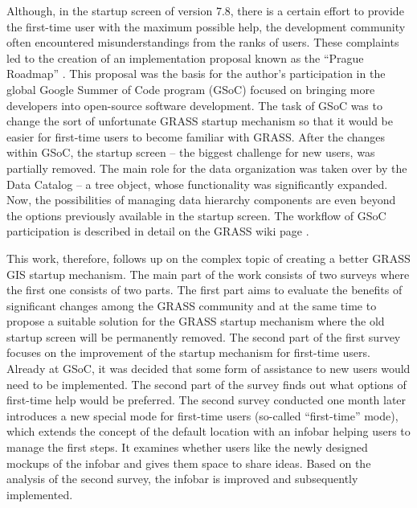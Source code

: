 \documentclass[a4paper,10pt,twoside]{article}
\begin{document}
Although, in the startup screen of version 7.8, there is a certain
effort to provide the first-time user with the maximum possible help,
the development community often encountered misunderstandings from the
ranks of users. These complaints led to the creation of an
implementation proposal known as the ``Prague Roadmap'' \cite{roadmap}. 
This proposal was
the basis for the author's participation in the global Google
Summer of Code program (GSoC) focused on bringing more
developers into open-source software development. The task of GSoC was
to change the sort of unfortunate GRASS startup mechanism so that it
would be easier for first-time users to become familiar with
GRASS. After the changes within GSoC, the startup screen -- the
biggest challenge for new users, was partially removed. The main role for
the data organization was taken over by the Data Catalog -- a tree
object, whose functionality was significantly expanded. Now, the
possibilities of managing data hierarchy components are even beyond
the options previously available in the startup screen.
The workflow of GSoC participation is described in detail on the 
GRASS wiki page \cite{gsoc}. 

This work, therefore, follows up on the complex topic of creating a
better GRASS GIS startup mechanism. The main part of the work consists
of two surveys where the first one consists of two parts. The first part aims 
to evaluate the benefits of significant changes
among the GRASS community and at the same time to propose a suitable
solution for the GRASS startup mechanism where
the old startup screen will be permanently removed. The second part of the
first survey focuses on the improvement of the startup mechanism for
first-time users. Already at GSoC, it was decided that some form of
assistance to new users would need to be implemented. The second part
of the survey finds out what options of first-time help would be
preferred. The second survey conducted one month later introduces a
new special mode for first-time users (so-called ``first-time'' mode), which
extends the concept of the default location with an infobar helping
users to manage the first steps. It examines whether users like the
newly designed mockups of the infobar and gives them space to share
ideas. Based on the analysis of the second survey, the infobar is
improved and subsequently implemented.
\end{document}
